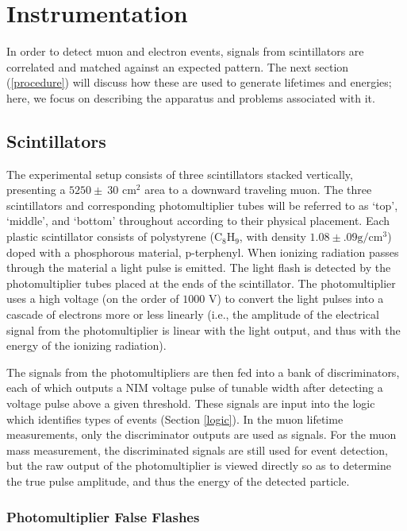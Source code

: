 \section{Instrumentation}
\label{instrumentation}

In order to detect muon and electron events, signals from scintillators are correlated and matched against an expected pattern. The next section (\ref{procedure}) will discuss how these are used to generate lifetimes and energies; here, we focus on describing the apparatus and problems associated with it.

\subsection{Scintillators}
\label{scintillators}

The experimental setup consists of three scintillators stacked vertically, presenting a $5250 \pm~30$ cm$^2$ area to a downward traveling muon. The three scintillators and corresponding photomultiplier tubes will be referred to as `top', `middle', and `bottom' throughout according to their physical placement.  Each plastic scintillator consists of polystyrene ($\mathrm{C}_{8}\mathrm{H}_{9}$, with density $1.08 \pm .09 {\mathrm{g}}/{\mathrm{cm}^{3}}$) doped with a phosphorous material, p-terphenyl. When ionizing radiation passes through the material a light pulse is emitted. The light flash is detected by the photomultiplier tubes placed at the ends of the scintillator. The photomultiplier uses a high voltage (on the order of $1000$ V) to convert the light pulses into a cascade of electrons more or less linearly (i.e., the amplitude of the electrical signal from the photomultiplier is linear with the light output, and thus with the energy of the ionizing radiation).

The signals from the photomultipliers are then fed into a bank of discriminators, each of which outputs a NIM voltage pulse of tunable width after detecting a voltage pulse above a given threshold. These signals are input into the logic which identifies types of events (Section \ref{logic}). In the muon lifetime measurements, only the discriminator outputs are used as signals. For the muon mass measurement, the discriminated signals are still used for event detection, but the raw output of the photomultiplier is viewed directly so as to determine the true pulse amplitude, and thus the energy of the detected particle. 

\subsubsection{Photomultiplier False Flashes}
\label{photomultiplierfalseflashes}

